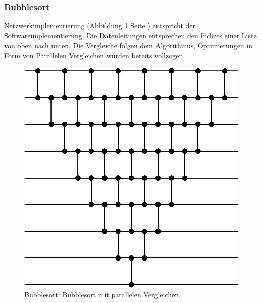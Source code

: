 \documentclass[11pt,ngerman]{article}
\begin{document}
\subsubsection{Bubblesort}
Netzwerkimplementierung (Abbildung \ref{fig:bubblesort} Seite \pageref{fig:bubblesort}) entspricht der Softwareimplementierung. Die Datenleitungen entsprechen den Indizes einer Liste von oben nach unten. Die Vergleiche folgen dem Algorithmus, Optimierungen in Form von Parallelen Vergleichen wurden bereits vollzogen.
\begin{figure}
\begin{center}
\includegraphics[scale=0.8]{bubblesort.eps}
\end{center}
\caption{Bubblesort: Bubblesort mit parallelen Vergleichen.}
\label{fig:bubblesort}
\end{figure}
\end{document}
